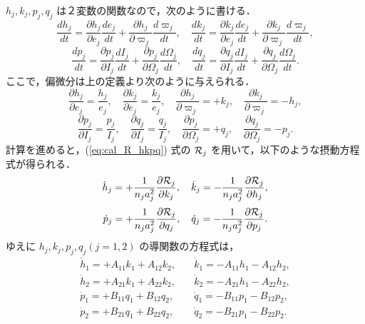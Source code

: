 \documentclass[11pt,a4paper,oneside,onecolumn]{jreport}
\begin{document}
$h_j, k_j, p_j, q_j$ は２変数の関数なので，次のように書ける．
\begin{equation}
\frac{d h_j}{dt} = \frac{\partial h_j}{\partial e_j} \frac{d e_j}{dt} + \frac{\partial h_j}{\partial \varpi_j} \frac{d \varpi_j}{dt} , \quad \frac{d k_j}{dt} = \frac{\partial k_j}{\partial e_j} \frac{d e_j}{dt} + \frac{\partial k_j}{\partial \varpi_j} \frac{d \varpi_j}{dt},
\end{equation}
\begin{equation}
\frac{d p_j}{dt} = \frac{\partial p_j}{\partial I_j} \frac{d I_j}{dt} + \frac{\partial p_j}{\partial \Omega_j} \frac{d \Omega_j}{dt} , \quad \frac{d q_j}{dt} = \frac{\partial q_j}{\partial I_j} \frac{d I_j}{dt} + \frac{\partial q_j}{\partial \Omega_j} \frac{d \Omega_j}{dt}.
\end{equation}
ここで，偏微分は上の定義より次のように与えられる．
\begin{equation}
\frac{\partial h_j}{\partial e_j} = \frac{h_j}{e_j}, \quad \frac{\partial k_j}{\partial e_j} = \frac{k_j}{e_j}, \quad \frac{\partial h_j}{\partial \varpi_j} = + k_j, \quad \frac{\partial k_j}{\partial \varpi_j} = - h_j,
\end{equation}
\begin{equation}
\frac{\partial p_j}{\partial I_j} = \frac{p_j}{I_j}, \quad \frac{\partial q_j}{\partial I_j} = \frac{q_j}{I_j}, \quad \frac{\partial p_j}{\partial \Omega_j} = + q_j, \quad \frac{\partial q_j}{\partial \Omega_j} = - p_j.
\end{equation}
計算を進めると，(\ref{eq:cal_R_hkpq}) 式の ${\cal R}_j$ を用いて，以下のような摂動方程式が得られる．
\begin{equation}
\dot{h}_j = + \frac{1}{n_j a_j^2} \frac{\partial {\cal R}_j}{\partial k_j}, \quad \dot{k}_j = - \frac{1}{n_j a_j^2} \frac{\partial {\cal R}_j}{\partial h_j},
\end{equation}
\begin{equation}
\dot{p}_j = + \frac{1}{n_j a_j^2} \frac{\partial {\cal R}_j}{\partial q_j}, \quad \dot{q}_j = - \frac{1}{n_j a_j^2} \frac{\partial {\cal R}_j}{\partial p_j}.
\end{equation}
ゆえに $h_j, k_j, p_j, q_j (j = 1, 2)$ の導関数の方程式は，
\begin{equation}
\begin{split}
\dot{h}_1= + A_{11} k_1 + A_{12} k_2, & \quad \dot{k}_1 = - A_{11} h_1 - A_{12} h_2, \\
\dot{h}_2 = + A_{21} k_1 + A_{22} k_2, & \quad \dot{k}_2 = - A_{21} h_1 - A_{22} h_2, \\
\dot{p}_1 = + B_{11} q_1 + B_{12} q_2, & \quad \dot{q}_1 = - B_{11} p_1 - B_{12} p_2, \\
\dot{p}_2 = + B_{21} q_1 + B_{22} q_2, & \quad \dot{q}_2 = - B_{21} p_1 - B_{22} p_2.
\end{split}
\end{equation}
\end{document}
